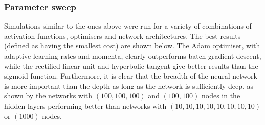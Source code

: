 \documentclass[11pt,british,a4paper]{article}
\numberwithin{equation}{section}
\begin{document}
\subsubsection{Parameter sweep}
Simulations similar to the ones above were run for a variety of combinations of activation functions, optimisers and network architectures. The best results (defined as having the smallest cost) are shown below. The Adam optimiser, with adaptive learning rates and momenta, clearly outperforms batch gradient descent, while the rectified linear unit and hyperbolic tangent give better results than the sigmoid function. Furthermore, it is clear that the breadth of the neural network is more important than the depth as long as the network is sufficiently deep, as shown by the networks with \((100,100,100)\) and \((100,100)\) nodes in the hidden layers performing better than networks with \((10,10,10,10,10,10,10,10)\) or \((1000)\) nodes.
\begin{table}[H]
    \centering
    \caption{Best choices of parameters, defined as giving the smallest cost function after \(\num{10000}\) epochs (``Error'' denotes the average squared deviation from the analytic solution). \(\num{1170}\) parameter combinations were tested. Adam denotes the \lstinline{tf.train.AdamOptimizer} with default parameters, which uses an adaptive learning rate \(\alpha\) and momentum \(\gamma\), thereby outperforming batch gradient descent with fixed learning rate and momentum. The architecture gives the numbers of nodes in the hidden layers. More results are available at \href{https://github.com/anjohan/ml3/tree/master/data}{github.com/anjohan/ml3/data}.}
\end{table}
\end{document}
